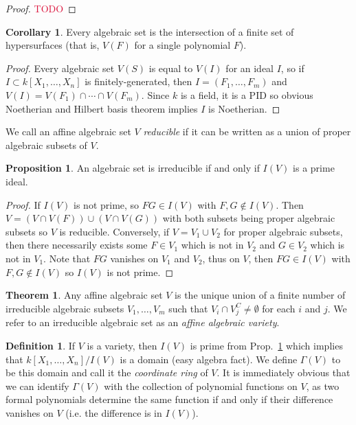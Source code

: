 \documentclass[aps,pra,showpacs,notitlepage,onecolumn,superscriptaddress,nofootinbib]{revtex4-1}
\newcommand{\pop}[1]{\textcolor{crimson}{#1}}
\theoremstyle{definition}
\newtheorem{definition}{Definition}[section]
\newtheorem{theorem}{Theorem}[section]
\newtheorem{corollary}{Corollary}[theorem]
\newtheorem{prop}{Proposition}[section]
\begin{document}
\begin{proof}
  \pop{TODO}
  \end{proof}

\begin{corollary}
  Every algebraic set is the intersection of a finite set of hypersurfaces (that is, $V(F)$ for a single polynomial $F$).
  \end{corollary}

\begin{proof}
  Every algebraic set $V(S)$ is equal to $V(I)$ for an ideal $I$, so if $I \subset k[X_1, \dots, X_n]$ is finitely-generated,
  then $I = (F_1, \dots, F_m)$ and $V(I) = V(F_1) \cap \cdots \cap V(F_m)$. Since $k$ is a field,
  it is a PID so obvious Noetherian and Hilbert basis theorem implies $I$ is Noetherian.
  \end{proof}

\noindent We call an affine algebraic set $V$ \emph{reducible} if it can be written as a union of proper algebraic
subsets of $V$.

\begin{prop}
  \label{prop:prime}
  An algebraic set is irreducible if and only if $I(V)$ is a prime ideal.
\end{prop}

\begin{proof}
 If $I(V)$ is not prime, so $F G \in I(V)$ with $F, G \notin I(V)$. Then $V = (V \cap V(F)) \cup (V \cap V(G))$
 with both subsets being proper algebraic subsets so $V$ is reducible. Conversely, if $V = V_1 \cup V_2$ for proper
 algebraic subsets, then there necessarily exists some $F \in V_1$ which is not in $V_2$ and $G \in V_2$ which is not in $V_1$.
 Note that $FG$ vanishes on $V_1$ and $V_2$, thus on $V$, then $FG \in I(V)$ with $F, G \notin I(V)$ so $I(V)$ is not prime.
  \end{proof}

\begin{theorem}
  Any affine algebraic set $V$ is the unique union of a finite number of irreducible algebraic subsets $V_1, \dots, V_m$
  such that $V_i \cap V_j^{C} \neq \emptyset$ for each $i$ and $j$. We refer to an irreducible algebraic set as an \emph{affine algebraic variety}. 
  \end{theorem}

\begin{definition}
  If $V$ is a variety, then $I(V)$ is prime from Prop.~\ref{prop:prime} which implies that
  $k[X_1, \dots, X_n]/I(V)$ is a domain (easy algebra fact). We define $\Gamma(V)$ to be this domain and
  call it the \emph{coordinate ring} of $V$. It is immediately obvious that we can identify $\Gamma(V)$
  with the collection of polynomial functions on $V$, as two formal polynomials determine the same function
  if and only if their difference vanishes on $V$ (i.e. the difference is in $I(V)$).
  \end{definition}
\end{document}
